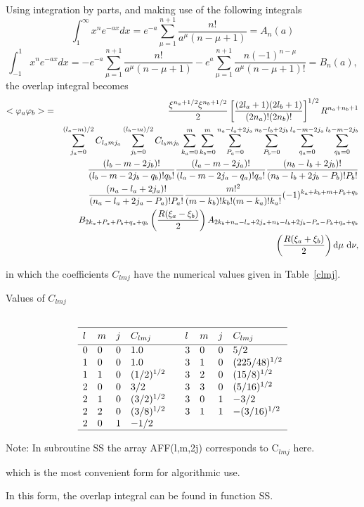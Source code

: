 Using integration by parts, and making use of the following
integrals
$$                
\int_1^{\infty}x^ne^{-ax}dx=e^{-a}\sum_{\mu=1}^{n+1}\frac{n!}{a^{\mu}(n-\mu+1)}=A_n(a) 
$$
$$
\int_{-1}^{1}x^ne^{-ax}dx=-e^{-a}\sum_{\mu=1}^{n+1}\frac{n!}{a^{\mu}(n-\mu+1)}
-e^a\sum_{\mu=1}^{n+1}\frac{n(-1)^{n-\mu}}{a^{\mu}(n-\mu+1)!} =B_n(a),
$$                
the overlap integral becomes
\begin{eqnarray}
<\varphi _a\varphi _b>& =&
\frac{\xi ^{n_a+1/2}\xi^{n_b+1/2}}{2}\left [\frac{(2l_a+1)(2l_b+1)}{(2n_a)!(2n_b)!}\right ]
^{1/2}R^{n_a+n_b+1} \nonumber \\ &&
\sum_{j_a=0}^{(l_a-m)/2}C_{l_amj_a}\sum_{j_b=0}^{(l_b-m)/2}
C_{l_bmj_b}\sum_{k_a=0}^m\sum_{k_b=0}^m
\sum_{P_a=0}^{n_a-l_a+2j_a}\sum_{P_b=0}^{n_b-l_b+2j_b}
\sum_{q_a=0}^{l_a-m-2j_a}\sum_{q_b=0}^{l_b-m-2j_b} \nonumber \\ &&
\frac{(l_b-m-2j_b)!}{(l_b-m-2j_b-q_b)!q_b!}
\frac{(l_a-m-2j_a)!}{(l_a-m-2j_a-q_a)!q_a!}
\frac{(n_b-l_b+2j_b)!}{(n_b-l_b+2j_b-P_b)!P_b!} \nonumber \\ &&
\frac{(n_a-l_a+2j_a)!}{(n_a-l_a+2j_a-P_a)!P_a!}
\frac{m!^2}{(m-k_b)!k_b!(m-k_a)!k_a!} 
(-1)^{k_a+k_b+m+P_b+q_b} \nonumber \\ &&
B_{2k_a+P_a+P_b+q_a+q_b}\left (\frac{R(\xi_a-\xi_b)}{2}\right ) 
A_{2k_b+n_a-l_a+2j_a+n_b-l_b+2j_b-P_a-P_b+q_a+q_b}\nonumber \\ &&
\left (\frac{R(\xi_a+\xi_b)}{2}\right ) 
{\rm d}\mu\ {\rm d}\nu , \nonumber
\end{eqnarray}


in which the coefficients $C_{lmj}$ have the numerical values given
in Table~\ref{clmj}.
\begin{table}
\caption{\label{clmj} Values of $C_{lmj}$}
$$
\begin{array}{lllllllll} \\ \hline
l & m & j & C_{lmj} & &    l & m\rule[-0.2cm]{0cm}{0.6cm} & j & C_{lmj} \\ \hline
0 & 0 & 0 & 1.0        & & 3 & 0 & 0 & 5/2 \\
1 & 0 & 0 & 1.0        & & 3 & 1 & 0 & (225/48)^{1/2} \\
1 & 1 & 0 & (1/2)^{1/2}& & 3 & 2 & 0 & (15/8)^{1/2} \\
2 & 0 & 0 & 3/2        & & 3 & 3 & 0 & (5/16)^{1/2} \\
2 & 1 & 0 & (3/2)^{1/2}& & 3 & 0 & 1 & -3/2 \\
2 & 2 & 0 & (3/8)^{1/2}& & 3 & 1 & 1 & -(3/16)^{1/2} \\ 
2 & 0 & 1 & -1/2       & & \\ \hline
\end{array}
$$
\begin{center}
 Note: In subroutine SS the array AFF(l,m,2j) corresponds to C$_{lmj}$ here.
\end{center}
\end{table}
which is the most convenient form for algorithmic use.

In this form, the overlap integral can be found in function SS.

